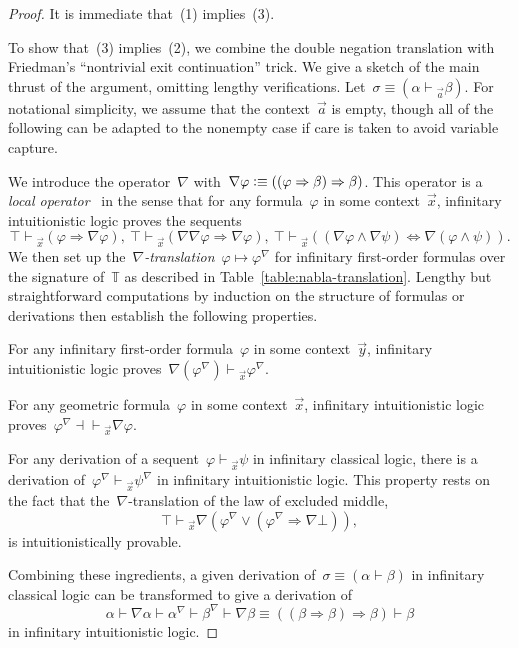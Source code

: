 \documentclass{ws-rv9x6}
\newcommand{\TT}{\mathbb{T}}
\newcommand{\defeqv}{\vcentcolon\equiv}
\renewcommand{\_}{\mathpunct{.}}
\newcommand{\?}{\,{:}\,}
\newcommand{\seq}[1]{\mathrel{\vdash\!\!\!_{#1}}}
\begin{document}
\begin{proof}It is immediate that~(1) implies~(3).

To show that~(3) implies~(2), we combine the double negation translation
with Friedman's ``nontrivial exit continuation'' trick. We give a sketch of the
main thrust of the argument,
omitting lengthy verifications. Let~$\sigma \equiv (\alpha \seq{\vec a} \beta)$.
For notational simplicity, we assume that the context~$\vec a$ is empty, though
all of the following can be adapted to the nonempty case if care is taken to
avoid variable capture.

We introduce the operator~$\nabla$ with~$\nabla\varphi \defeqv
((\varphi \Rightarrow \beta) \Rightarrow \beta)$. This operator is a
\emph{local operator}~\cite[Section~14.5]{goldblatt:topoi} in the sense that
for any formula~$\varphi$ in some context~$\vec x$, infinitary intuitionistic
logic proves the sequents
\[
\top \seq{\vec x} (\varphi \Rightarrow \nabla\varphi),\
\top \seq{\vec x} (\nabla\nabla\varphi \Rightarrow \nabla\varphi),\
\top \seq{\vec x} ((\nabla\varphi \wedge \nabla\psi) \Leftrightarrow \nabla(\varphi \wedge \psi)).
\]
We then set up the~\emph{$\nabla$-translation}~$\varphi \mapsto \varphi^\nabla$
for infinitary first-order formulas over the signature of~$\TT$ as described in
Table~\ref{table:nabla-translation}.
Lengthy but straightforward computations by induction on the structure of
formulas or derivations then establish the following properties.
\begin{alphlist}
\item For any infinitary first-order formula~$\varphi$ in some context~$\vec y$,
infinitary intuitionistic logic proves~$\nabla(\varphi^\nabla) \seq{\vec x} \varphi^\nabla$.
\item For any geometric formula~$\varphi$ in some context~$\vec x$, infinitary
intuitionistic logic proves~$\varphi^\nabla \mathrel{\dashv\vdash\!\!\!_{\vec x}} \nabla\varphi$.
\item For any derivation of a sequent~$\varphi \seq{\vec x} \psi$ in infinitary
classical logic, there is a derivation of~$\varphi^\nabla \seq{\vec x}
\psi^\nabla$ in infinitary intuitionistic logic. This property rests on the
fact that the~$\nabla$-translation of the law of excluded middle,
\[ \top \seq{\vec x} \nabla(\varphi^\nabla \vee (\varphi^\nabla \Rightarrow \nabla\bot)), \]
is intuitionistically provable.
\end{alphlist}
Combining these ingredients, a given derivation of~$\sigma \equiv (\alpha
\vdash \beta)$ in infinitary classical logic can be transformed to give a derivation of
\[
  \alpha \vdash
  \nabla\alpha \vdash
  \alpha^\nabla \vdash
  \beta^\nabla \vdash
  \nabla\beta \equiv
  ((\beta \Rightarrow \beta) \Rightarrow \beta) \vdash
  \beta
\]
in infinitary intuitionistic logic.


\end{proof}
\end{document}
